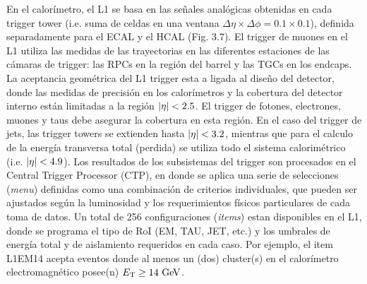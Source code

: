 En el calorímetro, el L1 se basa en las se\~nales analógicas obtenidas en cada trigger
tower (i.e. suma de celdas en una ventana $\Delta \eta \times \Delta \phi = 0.1 \times 0.1$),
definida separadamente para el ECAL y el HCAL (Fig. 3.7). El trigger de muones en el L1 utiliza las medidas de
las trayectorias en las diferentes estaciones de las cámaras de trigger: las RPCs en la región
del barrel y las TGCs en los endcaps. La aceptancia geométrica del L1 trigger esta a ligada
al dise\~no del detector, donde las medidas de precisión en los calorímetros y la cobertura
del detector interno están limitadas a la región $\abseta < 2.5$. El trigger de fotones, electrones,
muones y taus debe asegurar la cobertura en esta región. En el caso del trigger de jets,
las trigger towers se extienden hasta $\abseta < 3.2$, mientras que para el calculo de la energía
transversa total (perdida) se utiliza todo el sistema calorimétrico (i.e. $\abseta < 4.9$).
Los resultados de los subsistemas del trigger son procesados en el Central Trigger Processor
(CTP), en donde se aplica una serie de selecciones (\emph{menu}) definidas como una
combinación de criterios individuales, que pueden ser ajustados según la luminosidad y los
requerimientos físicos particulares de cada toma de datos. Un total de 256 configuraciones
(\emph{items}) estan disponibles en el L1, donde se programa el tipo de RoI (EM, TAU, JET, etc.)
y los umbrales de energía total y de aislamiento requeridos en cada caso. Por ejemplo,
el  item L1EM14 acepta eventos donde al menos un (dos) cluster(s) en el calorímetro
electromagnético posee(n) $\et \geq 14 \GeV$.

